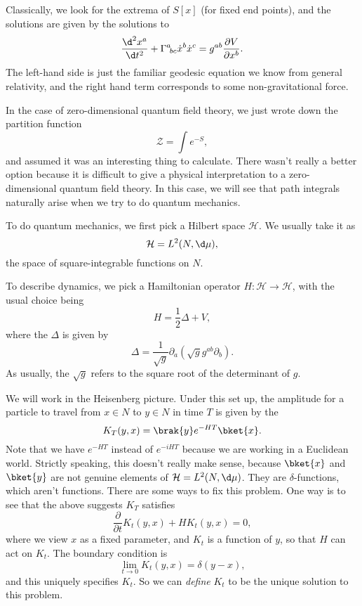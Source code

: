 \documentclass[a4paper]{article}
\begin{document}
Classically, we look for the extrema of $S[x]$ (for fixed end points), and the solutions are given by the solutions to
\[
  \frac{\d^2 x^a}{\d t^2} + \Gamma^a\!_{bc} \dot{x}^b \dot{x}^c = g^{ab} \frac{\partial V}{\partial x^b}.
\]
The left-hand side is just the familiar geodesic equation we know from general relativity, and the right hand term corresponds to some non-gravitational force.

In the case of zero-dimensional quantum field theory, we just wrote down the partition function
\[
  \mathcal{Z} = \int e^{-S},
\]
and assumed it was an interesting thing to calculate. There wasn't really a better option because it is difficult to give a physical interpretation to a zero-dimensional quantum field theory. In this case, we will see that path integrals naturally arise when we try to do quantum mechanics.

To do quantum mechanics, we first pick a Hilbert space $\mathcal{H}$. We usually take it as
\[
  \mathcal{H} = L^2(N, \d \mu),
\]
the space of square-integrable functions on $N$.

To describe dynamics, we pick a Hamiltonian operator $H: \mathcal{H} \to \mathcal{H}$, with the usual choice being
\[
  H = \frac{1}{2} \Delta + V,
\]
where the  $\Delta$\index{$\Delta$} is given by
\[
  \Delta = \frac{1}{\sqrt{g}} \partial_a(\sqrt{g} g^{ab} \partial_b).
\]
As usually, the $\sqrt{g}$ refers to the square root of the determinant of $g$.

We will work in the Heisenberg picture. Under this set up, the amplitude for a particle to travel from $x \in N$ to $y \in N$ in time $T$ is given by the 
\[
  K_T(y, x) = \brak{y} e^{-HT}\bket{x}.
\]
Note that we have $e^{-HT}$ instead of $e^{-iHT}$ because we are working in a Euclidean world. Strictly speaking, this doesn't really make sense, because $\bket{x}$ and $\bket{y}$ are not genuine elements of $\mathcal{H} = L^2(N, \d \mu)$. They are $\delta$-functions, which aren't functions. There are some ways to fix this problem. One way is to see that the above suggests $K_T$ satisfies
\[
  \frac{\partial}{\partial t} K_t(y, x) + H K_t(y, x) = 0,
\]
where we view $x$ as a fixed parameter, and $K_t$ is a function of $y$, so that $H$ can act on $K_t$. The boundary condition is
\[
  \lim_{t \to 0} K_t(y, x) = \delta (y - x),
\]
and this uniquely specifies $K_t$. So we can \emph{define} $K_t$ to be the unique solution to this problem.
\end{document}
